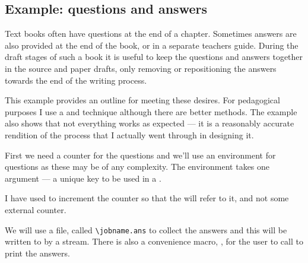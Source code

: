{{{{\begin{fboxverbatim}
\addtocounter{chapter}{-1}
\setcounter{pseudo}{5}
\begin{figure}
\end{figure}
\begin{figure}
\end{figure}
\end{fboxverbatim}



\subsection{Example: questions and answers}


    Text books often have questions at the end of a chapter. Sometimes answers
are also provided at the end of the book, or in a separate teachers guide.
During the draft stages of such a book it is useful to keep the
questions and answers together in the source and paper drafts, only removing
or repositioning the answers towards the end of the writing process.

    This example provides an outline for meeting these desires. For 
pedagogical purposes I use a \cmd{\label} and \cmd{\ref} technique although
there are better methods. The example also shows that not
everything works as expected --- it is a reasonably accurate rendition
of the process that I actually went through in designing it.

    First we need a counter for the questions and we'll use an 
environment
for questions as these may be of any complexity. The environment takes one
argument --- a unique key to be used in a \cmd{\label}.
\begin{lcode}
 \setcounter{question}{0}
\renewcommand{\thequestion}{\arabic{question}}
\newenvironment{question}[1]%
  {\refstepcounter{question}
   \par\noindent\textbf{Question \thequestion:}\label{#1}}%
  {\par}
\end{lcode}
I have used  to increment 
the counter so that
the \cmd{\label} will refer to it, and not some external counter.

    We will use a file, called \verb?\jobname.ans? to collect the answers
and this will be written to by a stream. 
There is also a convenience
macro, \cmd{\printanswers}, for the user to call to print the answers.
\begin{lcode}
\end{lcode}


}}}}
